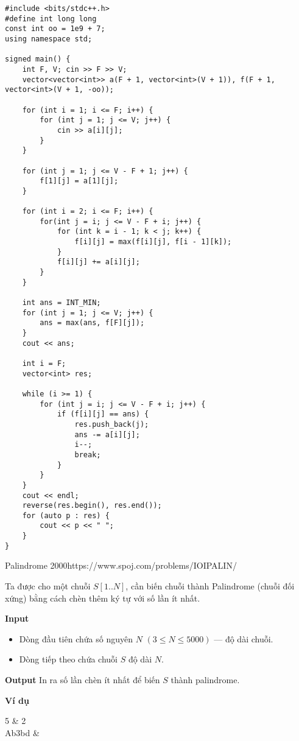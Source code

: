 \begin{lstlisting}[title=\centering \textbf{Cài đặt}]
#include <bits/stdc++.h>
#define int long long
const int oo = 1e9 + 7;
using namespace std;

signed main() {
    int F, V; cin >> F >> V;
    vector<vector<int>> a(F + 1, vector<int>(V + 1)), f(F + 1, vector<int>(V + 1, -oo));

    for (int i = 1; i <= F; i++) {
        for (int j = 1; j <= V; j++) {
            cin >> a[i][j];
        }
    }

    for (int j = 1; j <= V - F + 1; j++) {
        f[1][j] = a[1][j];
    }

    for (int i = 2; i <= F; i++) {
        for(int j = i; j <= V - F + i; j++) {
            for (int k = i - 1; k < j; k++) {
                f[i][j] = max(f[i][j], f[i - 1][k]);
            }
            f[i][j] += a[i][j];
        }
    }

    int ans = INT_MIN;
    for (int j = 1; j <= V; j++) {
        ans = max(ans, f[F][j]);
    }
    cout << ans;

    int i = F;
    vector<int> res;

    while (i >= 1) {
        for (int j = i; j <= V - F + i; j++) {
            if (f[i][j] == ans) {
                res.push_back(j);
                ans -= a[i][j];
                i--;
                break;
            }
        }
    }
    cout << endl;
    reverse(res.begin(), res.end());
    for (auto p : res) {
        cout << p << " ";
    }
}
\end{lstlisting}

\begin{baitap}{Palindrome 2000}{https://www.spoj.com/problems/IOIPALIN/}

Ta được cho một chuỗi $S[1..N]$, cần biến chuỗi thành Palindrome (chuỗi đối xứng) bằng cách chèn thêm ký tự với số lần ít nhất.

\textbf{Input}
\begin{itemize}[noitemsep]
    \item Dòng đầu tiên chứa số nguyên $N$ $(3 \leq N \leq 5000)$ — độ dài chuỗi.
    \item Dòng tiếp theo chứa chuỗi $S$ độ dài $N$.
\end{itemize}

\textbf{Output}  
In ra số lần chèn ít nhất để biến $S$ thành palindrome.

\textbf{Ví dụ}

\begin{sampleio}
5 & 2 \\
Ab3bd & \\
\end{sampleio}
\end{baitap}

